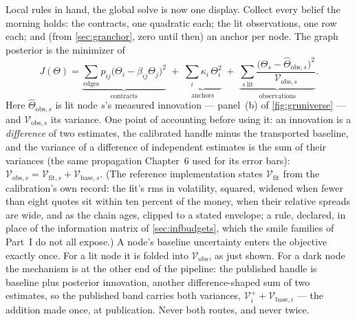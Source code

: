 Local rules in hand, the global solve is now one display.  Collect
every belief the morning holds: the contracts, one quadratic each; the
lit observations, one row each; and (from \cref{sec:granchor}, zero
until then) an anchor per node.  The graph posterior is the minimizer
of
\begin{equation}
\boxed{\;
J(\Theta)
=\underbrace{\sum_{\text{edges}}
p_{ij}\bigl(\Theta_i-\beta_{ij}\Theta_j\bigr)^{2}}_{\text{contracts}}
\;+\;
\underbrace{\sum_{i}\kappa_i\,\Theta_i^{2}}_{\text{anchors}}
\;+\;
\underbrace{\sum_{s\ \text{lit}}
\frac{\bigl(\Theta_s-\hat\Theta_{\mathrm{obs},s}\bigr)^{2}}
{\mathcal{V}_{\mathrm{obs},s}}}_{\text{observations}} .
\;}
\label{eq:grjoint}
\end{equation}
Here $\hat\Theta_{\mathrm{obs},s}$ is lit node $s$'s measured
innovation --- panel~(b) of \cref{fig:gruniverse} --- and
$\mathcal{V}_{\mathrm{obs},s}$ its variance.  One point of accounting
before using it: an innovation is a \emph{difference} of two
estimates, the calibrated handle minus the transported baseline, and
the variance of a difference of independent estimates is the sum of
their variances (the same propagation Chapter~6 used for its error
bars): $\mathcal{V}_{\mathrm{obs},s}
=\mathcal{V}_{\mathrm{fit},s}+\mathcal{V}_{\mathrm{base},s}$.  (The
reference implementation states $\mathcal{V}_{\mathrm{fit}}$ from
the calibration's own record: the fit's rms in volatility, squared,
widened when fewer than eight quotes sit within ten percent of the
money, when their relative spreads are wide, and as the chain ages,
clipped to a stated envelope; a rule, declared, in place of the
information matrix of \cref{sec:infbudgets}, which the smile families
of Part~I do not all expose.)  A
node's baseline uncertainty enters the objective exactly once.  For a
lit node it is folded into $\mathcal{V}_{\mathrm{obs}}$, as just
shown.  For a dark node the mechanism is at the other end of the
pipeline: the published handle is baseline plus posterior innovation,
another difference-shaped sum of two estimates, so the published band
carries both variances,
$\mathcal{V}^{+}_i+\mathcal{V}_{\mathrm{base},i}$ --- the addition
made once, at publication.  Never both routes, and never twice.

